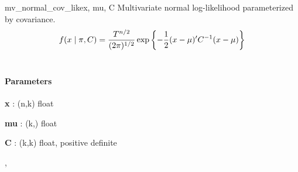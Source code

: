 \begin{funcdesc}{mv\_normal\_cov\_like}{x, mu, C}
\hypertarget{pymc.distributions.mv_normal_cov_like}{}
Multivariate normal log-likelihood parameterized by covariance.
\begin{gather}
\begin{split}f(x \mid \pi, C) = \frac{T^{n/2}}{(2\pi)^{1/2}} \exp\left\{ -\frac{1}{2} (x-\mu)^{\prime}C^{-1}(x-\mu) \right\}\end{split}\notag\\\begin{split}\end{split}\notag
\end{gather}

\paragraph{Parameters}\begin{paramlist}

\item[] \textbf{x} : (n,k) float

\item[] \textbf{mu} : (k,) float

\item[] \textbf{C} : (k,k) float, positive definite
\end{paramlist}




\hyperlink{pymc.distributions.mv_normal_like}{}, \hyperlink{pymc.distributions.mv_normal_chol_like}{}


\end{funcdesc}


